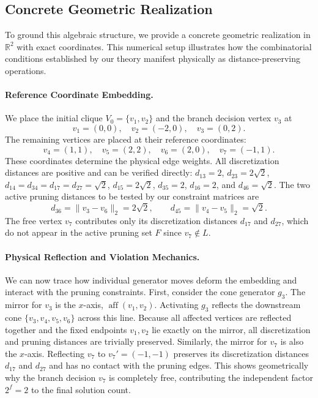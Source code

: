 \subsection{Concrete Geometric Realization}
\label{sec:example-geometry}

To ground this algebraic structure, we provide a concrete geometric realization in $\mathbb{R}^2$ with exact coordinates. This numerical setup illustrates how the combinatorial conditions established by our theory manifest physically as distance-preserving operations.

\paragraph{Reference Coordinate Embedding.}
We place the initial clique $V_0 = \{v_1, v_2\}$ and the branch decision vertex $v_3$ at
\[
v_1 = (0,0), \quad v_2 = (-2,0), \quad v_3 = (0,2).
\]
The remaining vertices are placed at their reference coordinates:
\[
v_4 = (1, 1), \quad v_5 = (2, 2), \quad v_6 = (2, 0), \quad v_7 = (-1,1).
\]
These coordinates determine the physical edge weights. All discretization distances are positive and can be verified directly: $d_{13} = 2$, $d_{23} = 2\sqrt{2}$, $d_{14} = d_{34} = d_{17} = d_{27} = \sqrt{2}$, $d_{15} = 2\sqrt{2}$, $d_{35} = 2$, $d_{16} = 2$, and $d_{46} = \sqrt{2}$. The two active pruning distances to be tested by our constraint matrices are
\[
d_{36} = \|v_3 - v_6\|_2 = 2\sqrt{2},
\qquad
d_{45} = \|v_4 - v_5\|_2 = \sqrt{2}.
\]
The free vertex $v_7$ contributes only its discretization distances $d_{17}$ and $d_{27}$, which do not appear in the active pruning set $F$ since $v_7 \notin L$.

\paragraph{Physical Reflection and Violation Mechanics.}
We can now trace how individual generator moves deform the embedding and interact with the pruning constraints. First, consider the cone generator $g_3$. The mirror for $v_3$ is the $x$-axis, $\operatorname{aff}(v_1, v_2)$. Activating $g_3$ reflects the downstream cone $\{v_3, v_4, v_5, v_6\}$ across this line. Because all affected vertices are reflected together and the fixed endpoints $v_1,v_2$ lie exactly on the mirror, all discretization and pruning distances are trivially preserved. Similarly, the mirror for $v_7$ is also the $x$-axis. Reflecting $v_7$ to $v_7' = (-1,-1)$ preserves its discretization distances $d_{17}$ and $d_{27}$ and has no contact with the pruning edges. This shows geometrically why the branch decision $v_7$ is completely free, contributing the independent factor $2^f = 2$ to the final solution count.

